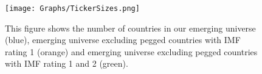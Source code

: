 \documentclass{article}
\begin{document}
\begin{figure}
    \centering
    \texttt{[image: Graphs/TickerSizes.png]}
    \caption{This figure shows the number of countries in our emerging universe (blue), emerging universe excluding pegged countries with IMF rating 1 (orange) and emerging universe excluding pegged countries with IMF rating 1 and 2 (green).}
    \label{TICKERS}
\end{figure}

\newpage
\end{document}
